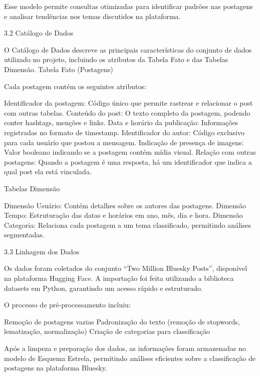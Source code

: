 \documentclass[
  letterpaper,
  DIV=11,
  numbers=noendperiod]{scrartcl}
\begin{document}
Esse modelo permite consultas otimizadas para identificar padrões nas
postagens e analisar tendências nos temas discutidos na plataforma.

3.2 Catálogo de Dados

O Catálogo de Dados descreve as principais características do conjunto
de dados utilizado no projeto, incluindo os atributos da Tabela Fato e
das Tabelas Dimensão. Tabela Fato (Postagens)

Cada postagem contém os seguintes atributos:

\begin{VerbatimWithBreaks}
Identificador da postagem: Código único que permite rastrear e relacionar o post com outras tabelas.
Conteúdo do post: O texto completo da postagem, podendo conter hashtags, menções e links.
Data e horário da publicação: Informações registradas no formato de timestamp.
Identificador do autor: Código exclusivo para cada usuário que postou a mensagem.
Indicação de presença de imagens: Valor booleano indicando se a postagem contém mídia visual.
Relação com outras postagens: Quando a postagem é uma resposta, há um identificador que indica a qual post ela está vinculada.
\end{VerbatimWithBreaks}

Tabelas Dimensão

\begin{VerbatimWithBreaks}
Dimensão Usuário: Contém detalhes sobre os autores das postagens.
Dimensão Tempo: Estruturação das datas e horários em ano, mês, dia e hora.
Dimensão Categoria: Relaciona cada postagem a um tema classificado, permitindo análises segmentadas.
\end{VerbatimWithBreaks}

3.3 Linhagem dos Dados

Os dados foram coletados do conjunto ``Two Million Bluesky Posts'',
disponível na plataforma Hugging Face. A importação foi feita utilizando
a biblioteca datasets em Python, garantindo um acesso rápido e
estruturado.

O processo de pré-processamento incluiu:

\begin{VerbatimWithBreaks}
Remoção de postagens vazias
Padronização do texto (remoção de stopwords, lematização, normalização)
Criação de categorias para classificação
\end{VerbatimWithBreaks}

Após a limpeza e preparação dos dados, as informações foram armazenadas
no modelo de Esquema Estrela, permitindo análises eficientes sobre a
classificação de postagens na plataforma Bluesky.
\end{document}
